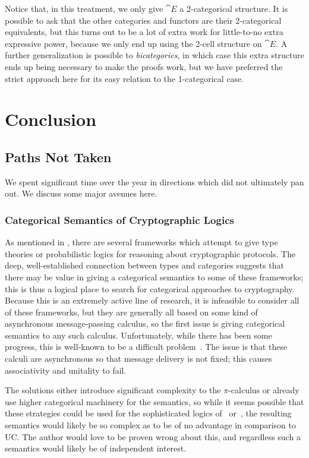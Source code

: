 Notice that, in this treatment, we only give $\cat{E}$ a 2-categorical
structure. It is possible to ask that the other categories and functors are
their 2-categorical equivalents, but this turns out to be a lot of extra work
for little-to-no extra expressive power, because we only end up using the 2-cell
structure on $\cat{E}$. A further generalization is possible to
\emph{bicategories}, in which case this extra structure ends up being necessary
to make the proofs work, but we have preferred the strict approach here for its
easy relation to the 1-categorical case.

\section{Conclusion}
\subsection{Paths Not Taken}

We spent significant time over the year in directions which did not ultimately
pan out. We discuss some major avenues here.

\subsubsection{Categorical Semantics of Cryptographic Logics}

As mentioned in ,
there are several frameworks which attempt to give type theories or
probabilistic logics for reasoning about cryptographic protocols. The deep,
well-established connection between types and categories suggests that there may
be value in giving a categorical semantics to some of these frameworks; this is
thus a logical place to search for categorical approaches to cryptography.
Because this is an extremely active line of research, it is infeasible to
consider all of these frameworks, but they are generally all based on some kind
of asynchronous message-passing calculus, so the first issue is giving
categorical semantics to any such calculus. Unfortunately, while there has been
some progress, this is well-known to be a difficult
problem~\cite{leifer-2000,stay-2015,sakayori-2021}. The issue is that these
calculi are asynchronous so that message delivery is not fixed; this causes
associativity and unitality to fail.

The solutions either introduce significant complexity to the $\pi$-calculus or
already use higher categorical machinery for the semantics, so while it seems
possible that these strategies could be used for the sophisticated logics
of~\cite{morisett-et-al-2021} or~\cite{liao-et-al-2019}, the resulting semantics
would likely be so complex as to be of no advantage in comparison to UC. The
author would love to be proven wrong about this, and regardless such a semantics
would likely be of independent interest.

